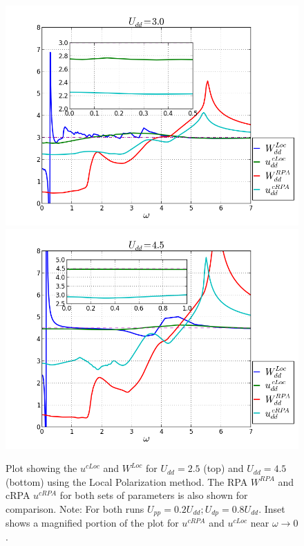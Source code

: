 \documentclass[10pt]{ruthesis}
\begin{document}
{\begin{figure}[H]
\begin{center}
 \includegraphics[width=0.85\columnwidth]{./plotForpublishing/ExactWUrpaWU/tbUdd3.png}
 \includegraphics[width=0.85\columnwidth]{./plotForpublishing/ExactWUrpaWU/tbUdd4p5.png}
 \caption{\label{fig7}Plot showing the $u^{cLoc}$ and $W^{Loc}$ for $U_{dd}=2.5$ (top) and $U_{dd}=4.5$ (bottom) using the Local Polarization method. The RPA $W^{RPA}$ and cRPA $u^{cRPA}$ for both sets of parameters is also shown for comparison. Note: For both runs $U_{pp}=0.2U_{dd}; U_{dp}=0.8U_{dd}$. Inset shows a magnified portion of the plot for $u^{cRPA}$ and $u^{cLoc}$ near $\omega \rightarrow 0$.   }
 \end{center}
\end{figure}





}
\end{document}
